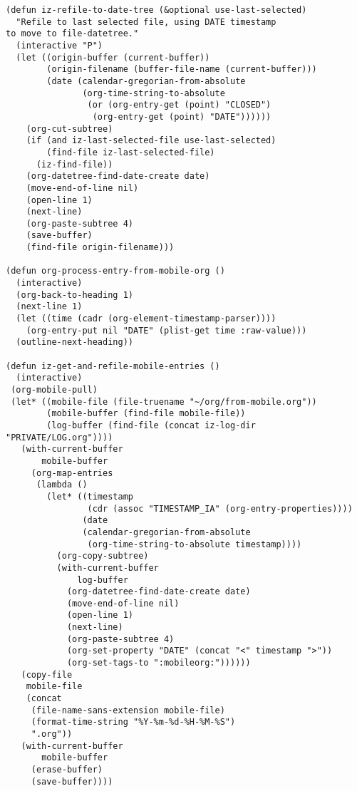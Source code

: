 \documentclass[10pt]{article}
\begin{document}
\begin{verbatim}
(defun iz-refile-to-date-tree (&optional use-last-selected)
  "Refile to last selected file, using DATE timestamp
to move to file-datetree."
  (interactive "P")
  (let ((origin-buffer (current-buffer))
        (origin-filename (buffer-file-name (current-buffer)))
        (date (calendar-gregorian-from-absolute
               (org-time-string-to-absolute
                (or (org-entry-get (point) "CLOSED")
                 (org-entry-get (point) "DATE"))))))
    (org-cut-subtree)
    (if (and iz-last-selected-file use-last-selected)
        (find-file iz-last-selected-file)
      (iz-find-file))
    (org-datetree-find-date-create date)
    (move-end-of-line nil)
    (open-line 1)
    (next-line)
    (org-paste-subtree 4)
    (save-buffer)
    (find-file origin-filename)))

(defun org-process-entry-from-mobile-org ()
  (interactive)
  (org-back-to-heading 1)
  (next-line 1)
  (let ((time (cadr (org-element-timestamp-parser))))
    (org-entry-put nil "DATE" (plist-get time :raw-value)))
  (outline-next-heading))

(defun iz-get-and-refile-mobile-entries ()
  (interactive)
 (org-mobile-pull)
 (let* ((mobile-file (file-truename "~/org/from-mobile.org"))
        (mobile-buffer (find-file mobile-file))
        (log-buffer (find-file (concat iz-log-dir "PRIVATE/LOG.org"))))
   (with-current-buffer
       mobile-buffer
     (org-map-entries
      (lambda ()
        (let* ((timestamp
                (cdr (assoc "TIMESTAMP_IA" (org-entry-properties))))
               (date
               (calendar-gregorian-from-absolute
                (org-time-string-to-absolute timestamp))))
          (org-copy-subtree)
          (with-current-buffer
              log-buffer
            (org-datetree-find-date-create date)
            (move-end-of-line nil)
            (open-line 1)
            (next-line)
            (org-paste-subtree 4)
            (org-set-property "DATE" (concat "<" timestamp ">"))
            (org-set-tags-to ":mobileorg:"))))))
   (copy-file
    mobile-file
    (concat
     (file-name-sans-extension mobile-file)
     (format-time-string "%Y-%m-%d-%H-%M-%S")
     ".org"))
   (with-current-buffer
       mobile-buffer
     (erase-buffer)
     (save-buffer))))


\end{verbatim}
\end{document}
